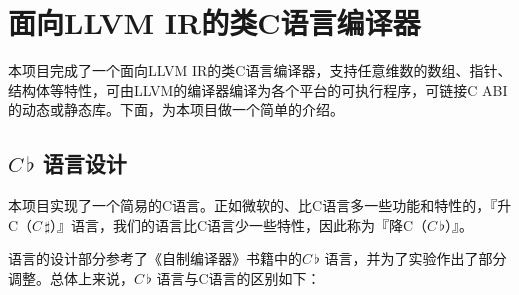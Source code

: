 \documentclass{ctexrep}
\newcommand{\cb}{$C\,\flat$\xspace}
\newcommand{\cs}{$C\,\sharp$\xspace}
\begin{document}
\chapter{面向LLVM IR的类C语言编译器}
本项目完成了一个面向LLVM IR\cite{lattnerLLVMCompilationFramework2004}的类C语言编译器，支持任意维数的数组、指针、结构体等特性，可由LLVM的编译器编译为各个平台的可执行程序，可链接C ABI的动态或静态库。下面，为本项目做一个简单的介绍。
\section{\cb 语言设计}
本项目实现了一个简易的C语言。正如微软的、比C语言多一些功能和特性的，『升C（\cs）』语言，我们的语言比C语言少一些特性，因此称为『降C（\cb）』。

语言的设计部分参考了《自制编译器\cite{qingmufenglangZiZhiBianYiQi}》书籍中的\cb 语言，并为了实验作出了部分调整。总体上来说，\cb 语言与C语言的区别如下：
\end{document}
